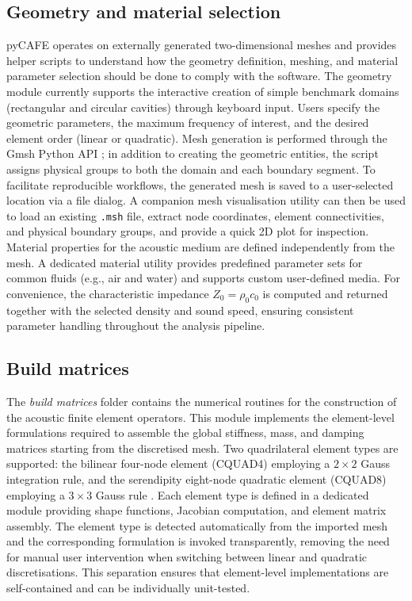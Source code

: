 \documentclass{jors}
\begin{document}
\subsection*{Geometry and material selection}
pyCAFE operates on externally generated two-dimensional meshes and provides helper scripts to understand how the geometry definition, meshing, and material parameter selection should be done to comply with the software. The geometry module currently supports the interactive creation of simple benchmark domains (rectangular and circular cavities) through keyboard input. Users specify the geometric parameters, the maximum frequency of interest, and the desired element order (linear or quadratic). Mesh generation is performed through the Gmsh Python API \cite{Gmsh2009}; in addition to creating the geometric entities, the script assigns physical groups to both the domain and each boundary segment. To facilitate reproducible workflows, the generated mesh is saved to a user-selected location via a file dialog. A companion mesh visualisation utility can then be used to load an existing \texttt{.msh} file, extract node coordinates, element connectivities, and physical boundary groups, and provide a quick 2D plot for inspection. Material properties for the acoustic medium are defined independently from the mesh. A dedicated material utility provides predefined parameter sets for common fluids (e.g., air and water) and supports custom user-defined media. For convenience, the characteristic impedance $Z_0 = \rho_0 c_0$ is computed and returned together with the selected density and sound speed, ensuring consistent parameter handling throughout the analysis pipeline.

\subsection*{Build matrices}
The \textit{build matrices} folder contains the numerical routines for the construction of the acoustic finite element operators. This module implements the element-level formulations required to assemble the global stiffness, mass, and damping matrices starting from the discretised mesh. Two quadrilateral element types are supported: the bilinear four-node element (CQUAD4) employing a $2 \times 2$ Gauss integration rule, and the serendipity eight-node quadratic element (CQUAD8) employing a $3 \times 3$ Gauss rule \cite{Beriot2016}. Each element type is defined in a dedicated module providing shape functions, Jacobian computation, and element matrix assembly. The element type is detected automatically from the imported mesh and the corresponding formulation is invoked transparently, removing the need for manual user intervention when switching between linear and quadratic discretisations. This separation ensures that element-level implementations are self-contained and can be individually unit-tested.
\end{document}

